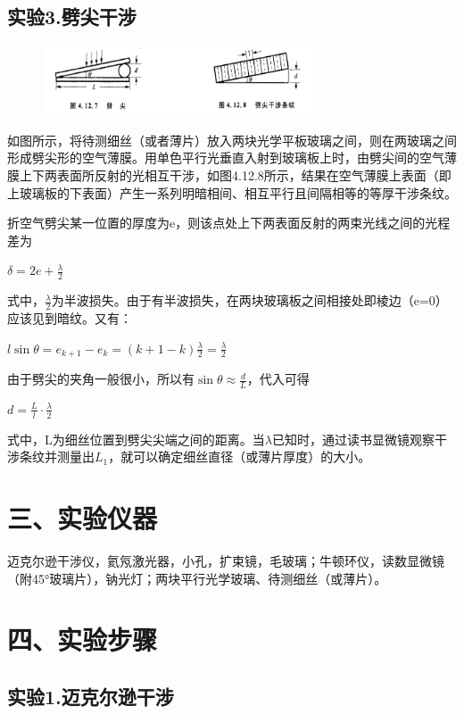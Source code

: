 \documentclass[11pt,a4paper,oneside]{article}
\begin{document}
\subsection*{实验3.劈尖干涉}
\begin{figure}[H]
 \centering
  \includegraphics[width=8cm]{Image/劈尖&劈尖干涉条纹.png}
\end{figure}
如图所示，将待测细丝（或者薄片）放入两块光学平板玻璃之间，则在两玻璃之间形成劈尖形的空气薄膜。用单色平行光垂直入射到玻璃板上时，由劈尖间的空气薄膜上下两表面所反射的光相互干涉，如图4.12.8所示，结果在空气薄膜上表面（即上玻璃板的下表面）产生一系列明暗相间、相互平行且间隔相等的等厚干涉条纹。

折空气劈尖某一位置的厚度为e，则该点处上下两表面反射的两束光线之间的光程差为
\begin{center}
$ \delta= 2e+\displaystyle\frac{\lambda }{2}$
\end{center}
式中，$\displaystyle\frac{\lambda }{2}$为半波损失。由于有半波损失，在两块玻璃板之间相接处即棱边（e=0）应该见到暗纹。又有：
\begin{center}
$ l\sin \theta =e_{k+1}-e_{k}=(k+1-k)\displaystyle\frac{\lambda }{2}=\displaystyle\frac{\lambda }{2}$
\end{center}
由于劈尖的夹角一般很小，所以有$\sin{{\theta}{\approx}\displaystyle\frac{d}{L}}$，代入可得
\begin{center}
$ d=\displaystyle\frac{L}{l}\cdot \displaystyle\frac{\lambda }{2}$
\end{center}
式中，L为细丝位置到劈尖尖端之间的距离。当$\lambda$已知时，通过读书显微镜观察干涉条纹并测量出$L_1$，就可以确定细丝直径（或薄片厚度）的大小。


\section*{三、实验仪器}
迈克尔逊干涉仪，氦氖激光器，小孔，扩束镜，毛玻璃；牛顿环仪，读数显微镜（附45°玻璃片），钠光灯；两块平行光学玻璃、待测细丝（或薄片）。

\section*{四、实验步骤}

\subsection*{实验1.迈克尔逊干涉}
\end{document}
